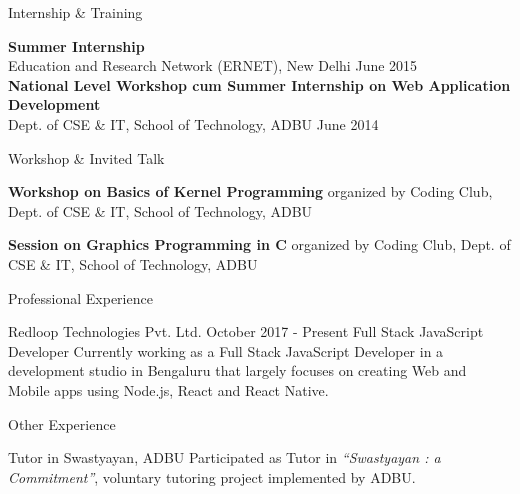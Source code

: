 \documentclass{resume}
\begin{document}
\begin{rSection}{Internship \& Training} \itemsep -3pt  
	
	{\textbf{Summer Internship} \\Education and Research Network (ERNET), New Delhi } \hfill June 2015 \\
	{\textbf{National Level Workshop cum Summer Internship on Web Application Development} \\Dept. of CSE \& IT, School of Technology, ADBU} \hfill June 2014
	
\end{rSection} 

\begin{rSection}{Workshop \& Invited Talk}
	
	\item \textbf{Workshop on Basics of Kernel Programming} organized by Coding Club, Dept. of CSE \& IT, School of Technology, ADBU
	\item \textbf{Session on Graphics Programming in C} organized by Coding Club, Dept. of CSE \& IT, School of Technology, ADBU
	
\end{rSection}

\begin{rSection}{Professional Experience}
	
	\begin{rSubsection}{Redloop Technologies Pvt. Ltd.} {October 2017 - Present}
		{Full Stack JavaScript Developer}{}
		Currently working as a Full Stack JavaScript Developer in a development studio in Bengaluru that largely focuses on creating Web and Mobile apps using Node.js, React and React Native.
	\end{rSubsection}
	
\end{rSection}

\begin{rSection}{Other Experience}
	
	\begin{rSubsection}{Tutor in Swastyayan, ADBU} {}
		{}{}
		Participated as Tutor in \textit{``Swastyayan : a Commitment''}, voluntary tutoring project implemented by ADBU.
	\end{rSubsection}
	
\end{rSection}
\end{document}
